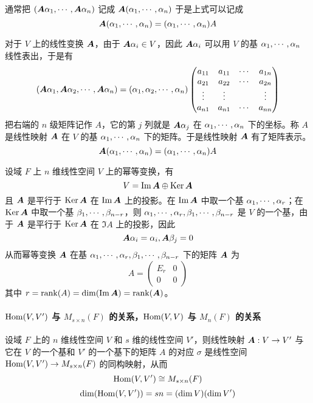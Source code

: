 通常把 $(\boldsymbol{A} \alpha_1,\cdots,\boldsymbol{A} \alpha_n)$ 记成 $\boldsymbol{A}(\alpha_1,\cdots,\alpha_n)$ 于是上式可以记成
\[ \boldsymbol{A}(\alpha_1,\cdots,\alpha_n) = (\alpha_1,\cdots,\alpha_n) A\]

对于 $V$ 上的线性变换 $\boldsymbol{A}$，由于 $\boldsymbol{A} \alpha_i \in V$，因此 $\boldsymbol{A} \alpha_i$ 可以用 $V$ 的基 $\alpha_1,\cdots,\alpha_n$ 线性表出，于是有
\[ 
	\left( \boldsymbol{A} \alpha_1 , \boldsymbol{A} \alpha_2 , \cdots , \boldsymbol{A} \alpha_n \right) = 
	\left( \alpha_1 , \alpha_2 , \cdots , \alpha_n \right)
	\left( \begin{matrix}
			a_{11} & a_{11} & \cdots & a_{1n} \\
			a_{21} & a_{22} & \cdots & a_{2n} \\
			\vdots & \vdots &		& \vdots \\
			a_{n1} & a_{n1} & \cdots & a_{nn}
		\end{matrix} \right)
\]
把右端的 $n$ 级矩阵记作 $A$，它的第 $j$ 列就是 $\boldsymbol{A} \alpha_j$ 在 $\alpha_1,\cdots,\alpha_n$ 下的坐标。称 $A$ 是线性映射 $\boldsymbol{A}$ 在 $V$ 的基 $\alpha_1,\cdots,\alpha_n$ 下的矩阵。于是线性映射 $\boldsymbol{A}$ 有了矩阵表示。
\[ \boldsymbol{A}(\alpha_1,\cdots,\alpha_n) = (\alpha_1,\cdots,\alpha_n) A\]

设域 $F$ 上 $n$ 维线性空间 $V$ 上的幂等变换，有
\[ V = \operatorname{Im} \boldsymbol{A} \oplus \operatorname{Ker} \boldsymbol{A} \]
且 $\boldsymbol{A}$ 是平行于 $\operatorname{Ker} \boldsymbol{A}$ 在 $\operatorname{Im} \boldsymbol{A}$ 上的投影。在 $\operatorname{Im} \boldsymbol{A}$ 中取一个基 $\alpha_1,\cdots,\alpha_r$；在 $\operatorname{Ker} \boldsymbol{A}$ 中取一个基 $\beta_1,\cdots,\beta_{n-r}$，则 $\alpha_1,\cdots,\alpha_r,\beta_1,\cdots,\beta_{n-r}$ 是 $V$ 的一个基，由于 $\boldsymbol{A}$ 是平行于 $\operatorname{Ker} \boldsymbol{A}$ 在 $\Im A$ 上的投影，因此
\[ \boldsymbol{A} \alpha_i = \alpha_i, \boldsymbol{A} \beta_j = 0 \]
从而幂等变换 $\boldsymbol{A}$ 在基 $\alpha_1,\cdots,\alpha_r,\beta_1,\cdots,\beta_{n-r}$ 下的矩阵 $\boldsymbol{A}$ 为
\[ A = \left(\begin{matrix}
			E_r & 0  \\
			0   & 0
		\end{matrix}\right) \]
其中 $r = \operatorname{rank}(A) = \dim(\operatorname{Im} \boldsymbol{A}) = \operatorname{rank}(\boldsymbol{A})$。

\paragraph{$\operatorname{Hom}(V,V')$ 与 $M_{s \times n}(F)$ 的关系，$\operatorname{Hom}(V,V)$ 与 $M_n(F)$ 的关系}

\begin{theorem}
	设域 $F$ 上的 $n$ 维线性空间 $V$ 和 $s$ 维的线性空间 $V'$，则线性映射 $\boldsymbol{A} : V \to V'$ 与它在 $V$ 的一个基和 $V'$ 的一个基下的矩阵 $A$ 的对应 $\sigma$ 是线性空间 $\operatorname{Hom}(V,V') \to M_{s \times n}(F)$ 的同构映射，从而
	\[ \operatorname{Hom}(V,V') \cong M_{s \times n}(F) \]
	\[ \dim(\operatorname{Hom}(V,V')) = sn = (\dim V)(\dim V') \]
\end{theorem}

